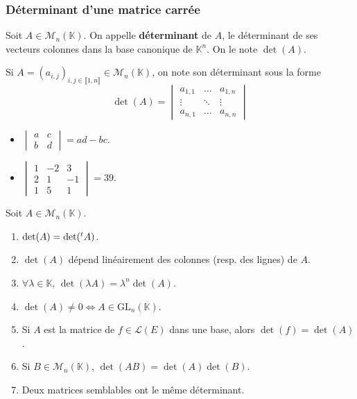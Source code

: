   \subsubsection{Déterminant d'une matrice carrée}

  \begin{definition}
    Soit $A \in \mathcal{M}_n(\mathbb{K})$. On appelle \textbf{déterminant} de $A$, le déterminant de ses vecteurs colonnes dans la base canonique de $\mathbb{K}^n$. On le note $\det(A)$.
  \end{definition}

  \begin{notation}
    Si $A = (a_{i,j})_{i, j \in \llbracket 1, n \rrbracket} \in \mathcal{M}_n(\mathbb{K})$, on note son déterminant sous la forme
    \[
    \det(A) =
    \begin{vmatrix}
      a_{1,1} & \dots & a_{1,n} \\
      \vdots & \ddots & \vdots \\
      a_{n,1} & \dots & a_{n,n}
    \end{vmatrix}
    \]
  \end{notation}


  \begin{example}
    \begin{itemize}
      \item $\begin{vmatrix}
        a & c \\
        b & d
      \end{vmatrix}
      = ad - bc$.
      \item $\begin{vmatrix}
        1 & -2 & 3 \\
        2 & 1 & -1 \\
        1 & 5 & 1
      \end{vmatrix}
      = 39$.
    \end{itemize}
  \end{example}


  \begin{proposition}
    Soit $A \in \mathcal{M}_n(\mathbb{K})$.
    \begin{enumerate}[label={\bfseries(\roman*)}]
      \item $\det(A) = \det(\mathstrut ^t A)$.
      \item $\det(A)$ dépend linéairement des colonnes (resp. des lignes) de $A$.
      \item $\forall \lambda \in \mathbb{K}, \, \det(\lambda A) = \lambda^n \det(A)$.
      \item $\det(A) \neq 0 \iff A \in \mathrm{GL}_n(\mathbb{K})$.
      \item Si $A$ est la matrice de $f \in \mathcal{L}(E)$ dans une base, alors $\det(f) = \det(A)$.
      \item Si $B \in \mathcal{M}_n(\mathbb{K})$, $\det(AB) = \det(A) \det(B)$.
      \item Deux matrices semblables ont le même déterminant.
    \end{enumerate}
  \end{proposition}

